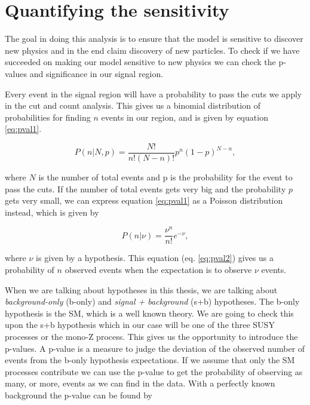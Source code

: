 \section{Quantifying the sensitivity}
\label{sec:significance}

The goal in doing this analysis is to ensure that the model is sensitive to discover new physics and in the end claim discovery of new particles. To check if we have succeeded on making our model sensitive to new physics we can check the p-values and significance in our signal region. 

Every event in the signal region will have a probability to pass the cuts we apply in the cut and count analysis. This gives us a binomial distribution of probabilities for finding $n$ events in our region, and is given by equation \ref{eq:pval1}. 

\begin{equation}
    \label{eq:pval1}
    P(n|N, p) = \frac{N!}{n!(N-n)!} p^n(1-p)^{N-n},
\end{equation}

where $N$ is the number of total events and p is the probability for the event to pass the cuts. If the number of total events gets very big and the probability $p$ gets very small, we can express equation \ref{eq:pval1} as a Poisson distribution instead, which is given by

\begin{equation}
    \label{eq:pval2}
    P(n|\nu) = \frac{\nu^n}{n!} e^{-\nu},
\end{equation}

where $\nu$ is given by a hypothesis. This equation (eq. \ref{eq:pval2}) gives us a probability of $n$ observed events when the expectation is to observe $\nu$ events. 

When we are talking about hypotheses in this thesis, we are talking about \textit{background-only} (b-only) and \textit{signal + background} (s+b) hypotheses. The b-only hypothesis is the SM, which is a well known theory. We are going to check this upon the s+b hypothesis which in our case will be one of the three SUSY processes or the mono-Z process. This gives us the opportunity to introduce the p-values. A p-value is a measure to judge the deviation of the observed number of events from the b-only hypothesis expectations. If we assume that only the SM processes contribute we can use the p-value to get the probability of observing as many, or more, events as we can find in the data. With a perfectly known background the p-value can be found by

